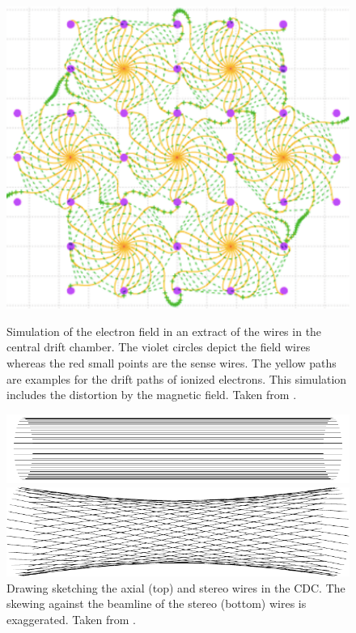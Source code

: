 \begin{figure}
  \caption[Simulation of the electron field in the central drift chamber.]{Simulation of the electron field in an extract of the wires in the central drift chamber. The violet circles depict the field wires whereas the red small points are the sense wires. The yellow paths are examples for the drift paths of ionized electrons. This simulation includes the distortion by the magnetic field. Taken from \cite{cdc_design}.}
  \includegraphics[width=0.5\linewidth]{figures/experimental_setup/electronsInCDC.pdf}
  \label{fig-sense-wires}
\end{figure}


\begin{figure}
  \centering
  \includegraphics{figures/experimental_setup/axialLayers.pdf}
  
  \vspace*{1.5cm}
  
  \includegraphics{figures/experimental_setup/stereoLayers.pdf}
  \caption[Sketch of the axial (top) and stereo wires in the CDC.]{Drawing sketching the axial (top) and stereo wires in the CDC. The skewing against the beamline of the stereo (bottom) wires is exaggerated. Taken from \cite{oliver}.}
  \label{fig-axial-stereo}
\end{figure}


